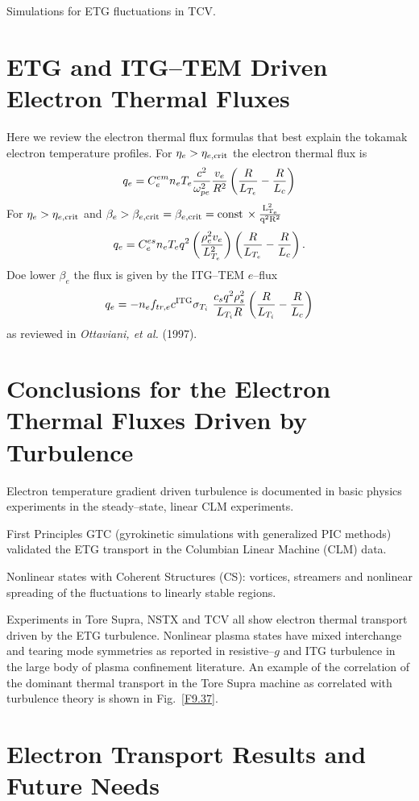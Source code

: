 \documentclass[a4paper,openany,12pt]{book}
\begin{document}
Simulations for ETG fluctuations in TCV.

\section{ETG and ITG--TEM Driven Electron Thermal Fluxes}

Here we review the electron thermal flux formulas that best explain the tokamak electron temperature profiles. For $\eta_e>\eta_{e,\rm crit}$ the electron thermal flux is
$$q_e=C_e^{em} n_e T_e{c^2\over\omega^2_{pe}}{v_e\over R^2}\left({R\over L_{T_e}}-{R\over L_c}\right)$$
For $\eta_e>\eta_{e,\rm crit}$ and $\beta_e>\beta_{e,\rm crit}=\beta_{e,\rm crit}=\rm const\,\times{L^2_{T_e}\over q^2 R^2}$
$$q_e=C_e^{es} n_e T_e q^2\left({\rho^2_e v_e\over L^2_{T_e}}\right)\left({R\over L_{T_e}}-{R\over L_c}\right).$$
Doe lower $\beta_e$ the flux is given by the ITG--TEM $e$--flux
$$q_e=-n_e f_{tr,e} c^{\rm ITG}\sigma_{T_i}\ {c_s q^2\rho^2_s\over L_{T_i} R}\left({R\over L_{T_i}}-{R\over L_c}\right)$$
as reviewed in \emph{Ottaviani, et al.} (1997).

\section{Conclusions for the Electron Thermal Fluxes Driven by Turbulence}

Electron temperature gradient driven turbulence is documented in basic physics experiments in the steady--state, linear CLM experiments.

First Principles GTC (gyrokinetic simulations with generalized PIC methods) validated the ETG transport in the Columbian Linear Machine (CLM) data.

Nonlinear states with Coherent Structures (CS): vortices, streamers and nonlinear spreading of the fluctuations to linearly stable regions.

Experiments in Tore Supra, NSTX and TCV all show electron thermal transport driven by the ETG turbulence. Nonlinear plasma states have mixed interchange and tearing mode symmetries as reported in resistive--$g$ and ITG turbulence in the large body of plasma confinement literature. An example of the correlation of the dominant thermal transport in the Tore Supra machine as correlated with turbulence theory is shown in Fig.~\ref{F9.37}.
%
\section{Electron Transport Results and Future Needs}
\end{document}
